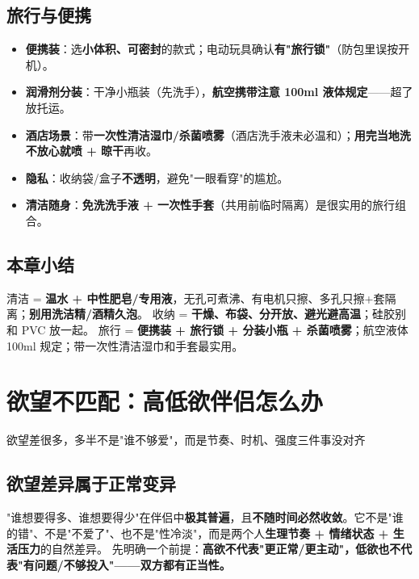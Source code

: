 \documentclass[12pt,UTF8,openany]{ctexbook}
\begin{document}
\section{旅行与便携}
\begin{itemize}[leftmargin=2em,itemsep=0.3em]
  \item \textbf{便携装}：选\textbf{小体积、可密封}的款式；电动玩具确认\textbf{有"旅行锁"}（防包里误按开机）。
  \item \textbf{润滑剂分装}：干净小瓶装（先洗手），\textbf{航空携带注意 100ml 液体规定}——超了放托运。
  \item \textbf{酒店场景}：带\textbf{一次性清洁湿巾/杀菌喷雾}（酒店洗手液未必温和）；\textbf{用完当地洗不放心就喷 + 晾干}再收。
  \item \textbf{隐私}：收纳袋/盒子\textbf{不透明}，避免"一眼看穿"的尴尬。
  \item \textbf{清洁随身}：\textbf{免洗洗手液 + 一次性手套}（共用前临时隔离）是很实用的旅行组合。
\end{itemize}

\section{本章小结}
清洁 = \textbf{温水 + 中性肥皂/专用液}，无孔可煮沸、有电机只擦、多孔只擦+套隔离；\textbf{别用洗洁精/酒精久泡}。
收纳 = \textbf{干燥、布袋、分开放、避光避高温}；硅胶别和 PVC 放一起。
旅行 = \textbf{便携装 + 旅行锁 + 分装小瓶 + 杀菌喷雾}；航空液体 100ml 规定；带一次性清洁湿巾和手套最实用。


\chapter{欲望不匹配：高低欲伴侣怎么办}

\begin{center}
\myhei\large 欲望差很多，多半不是"谁不够爱"，而是节奏、时机、强度三件事没对齐
\end{center}

\section{欲望差异属于正常变异}
"谁想要得多、谁想要得少"在伴侣中\textbf{极其普遍}，且\textbf{不随时间必然收敛}。它不是"谁的错"、不是"不爱了"、也不是"性冷淡"，而是两个人\textbf{生理节奏 + 情绪状态 + 生活压力}的自然差异。
先明确一个前提：\textbf{高欲不代表"更正常/更主动"，低欲也不代表"有问题/不够投入"——双方都有正当性。}
\end{document}

